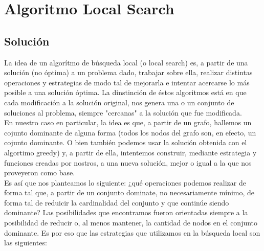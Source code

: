 \section{Algoritmo Local Search}

\subsection{Solución}
La idea de un algorítmo de búsqueda local (o local search) es, a partir de una solución (no óptima) a un problema dado, trabajar sobre ella, realizar distintas operaciones y estrategias de modo tal de mejorarla e intentar acercarse lo más posible a una solución óptima. La dinstinción de éstos algoritmos está en que cada modificación a la solución original, nos genera una o un conjunto de soluciones al problema, siempre "cercanas" a la solución que fue modificada. \\
En nuestro caso en particular, la idea es que, a partir de un grafo, hallemos un cojunto dominante de alguna forma (todos los nodos del grafo son, en efecto, un cojunto dominante. O bien también podemos usar la solución obtenida con el algortimo greedy) y, a partir de ella, intentemos construir, mediante estrategia y funciones creadas por nostros, a una nueva solución, mejor o igual a la que nos proveyeron como base. \\
Es así que nos planteamos lo siguiente: ¿qué operaciones podemos realizar de forma tal que, a partir de un conjunto dominate, no necesariamente mínimo, de forma tal de reduicir la cardinalidad del conjunto y que continúe siendo dominante? Las posibilidades que encontramos fueron orientadas siempre a la posibilidad de reducir o, al menos mantener, la cantidad de nodos en el conjunto dominante. Es por eso que las estrategias que utilizamos en la búsqueda local son las siguientes: 

